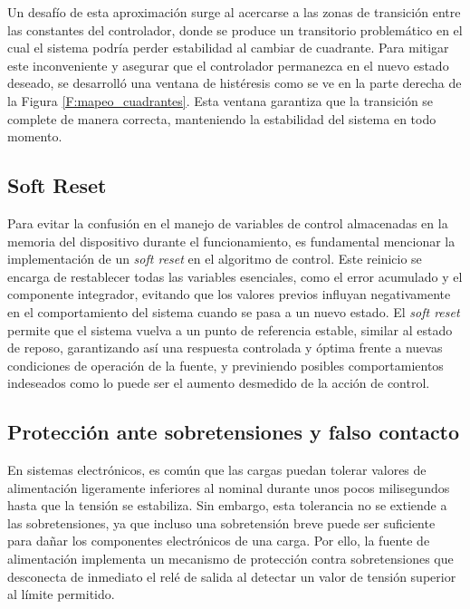 Un desafío de esta aproximación surge al acercarse a las zonas de transición entre las constantes del controlador, donde se produce un transitorio problemático en el cual el sistema podría perder estabilidad al cambiar de cuadrante. Para mitigar este inconveniente y asegurar que el controlador permanezca en el nuevo estado deseado, se desarrolló una ventana de histéresis como se ve en la parte derecha de la Figura \ref{F:mapeo_cuadrantes}. Esta ventana garantiza que la transición se complete de manera correcta, manteniendo la estabilidad del sistema en todo momento.\par


\subsection{Soft Reset}
Para evitar la confusión en el manejo de variables de control almacenadas en la memoria del dispositivo durante el funcionamiento, es fundamental mencionar la implementación de un \textit{soft reset} en el algoritmo de control. Este reinicio se encarga de restablecer todas las variables esenciales, como el error acumulado y el componente integrador, evitando que los valores previos influyan negativamente en el comportamiento del sistema cuando se pasa a un nuevo estado. El \textit{soft reset} permite que el sistema vuelva a un punto de referencia estable, similar al estado de reposo, garantizando así una respuesta controlada y óptima frente a nuevas condiciones de operación de la fuente, y previniendo posibles comportamientos indeseados como lo puede ser el aumento desmedido de la acción de control.\par


\subsection{Protección ante sobretensiones y falso contacto}
En sistemas electrónicos, es común que las cargas puedan tolerar valores de alimentación ligeramente inferiores al nominal durante unos pocos milisegundos hasta que la tensión se estabiliza. Sin embargo, esta tolerancia no se extiende a las sobretensiones, ya que incluso una sobretensión breve puede ser suficiente para dañar los componentes electrónicos de una carga. Por ello, la fuente de alimentación implementa un mecanismo de protección contra sobretensiones que desconecta de inmediato el relé de salida al detectar un valor de tensión superior al límite permitido. \par

